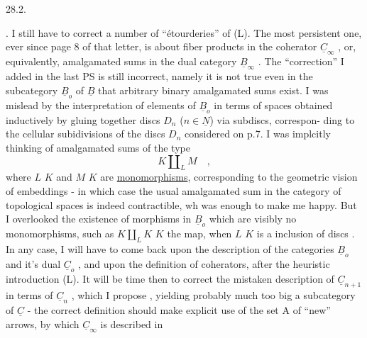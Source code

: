 
28.2.

. I still have to correct a number of ``étourderies'' of (L). The
most persistent one, ever since page 8 of that letter, is about fiber
products in the coherator $\underline{C}_\infty$ , or, equivalently, amalgamated sums in
the dual category $\underline{B}_\infty$ . The ``correction'' I added in the last PS   is
still incorrect, namely it is not true  even in the subcategory
$\underline{B}_o$ of $\underline{B}$ that arbitrary binary amalgamated sums exist. I was mislead
by the interpretation of elements of $\underline{B}_o$ in terms of  spaces\hand{,} obtained
inductively by gluing together discs $D_n$ ($n \in \underline{N}$) via subdiscs, correspon-%
ding to the cellular subidivisions of the discs $D_n$ considered on p.7.
I was implcitly thinking of amalgamated sums of the type
\[ K \amalg_L M \quad , \]
where $L$ \hand{$\to$} $K$ and $M$ \hand{$\to$}$K$ are \uline{monomorphisms}, corresponding to the geometric
vision of embeddings - in which case the usual amalgamated sum in the
category of topological spaces is indeed contractible, wh was enough
to make me happy. But I overlooked the existence of morphisms in $\underline{B}_o$
which are visibly no monomorphisms, such as $K \amalg_L K$ \hand{$\to$} $K$ the 
map, when $L$ \hand{$\to$}$K$ is a  inclusion of discs . In any case, I will have
to come back upon the description of the categories $\underline{B}_o$ and it's dual $\underline{C}_o$ ,
and upon the definition of coherators, after the heuristic introduction
(L). It will be time then  to correct the mistaken description of $\underline{C}_{n+1}$
in terms of $\underline{C}_n$ , which I propose  , yielding probably much too
big a subcategory of $\underline{C}$\hand{$_\infty$} - the correct definition should make explicit
use of the  set A of  ``new'' arrows, by which $\underline{C}_\infty$ is described in
